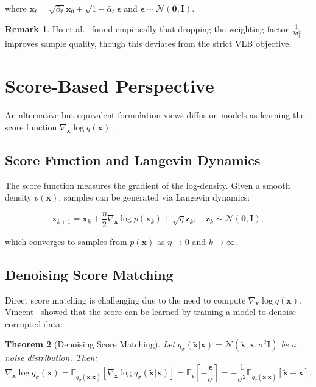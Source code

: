 \documentclass[12pt]{report}
\newtheorem{theorem}{Theorem}[section]
\theoremstyle{definition}
\newtheorem{remark}[theorem]{Remark}
\newcommand{\E}{\mathbb{E}}
\newcommand{\N}{\mathcal{N}}
\begin{document}
where $\mathbf{x}_t = \sqrt{\bar{\alpha}_t}\mathbf{x}_0 + \sqrt{1-\bar{\alpha}_t}\boldsymbol{\epsilon}$ and $\boldsymbol{\epsilon} \sim \N(\mathbf{0}, \mathbf{I})$.

\begin{remark}
Ho et al.~\citep{ho2020denoising} found empirically that dropping the weighting factor $\frac{1}{2\sigma_t^2}$ improves sample quality, though this deviates from the strict VLB objective.
\end{remark}

\section{Score-Based Perspective}

An alternative but equivalent formulation views diffusion models as learning the score function $\nabla_{\mathbf{x}} \log q(\mathbf{x})$~\citep{song2019generative, song2020score}.

\subsection{Score Function and Langevin Dynamics}

The score function measures the gradient of the log-density. Given a smooth density $p(\mathbf{x})$, samples can be generated via Langevin dynamics:

\begin{equation}
\mathbf{x}_{k+1} = \mathbf{x}_k + \frac{\eta}{2}\nabla_{\mathbf{x}} \log p(\mathbf{x}_k) + \sqrt{\eta}\mathbf{z}_k, \quad \mathbf{z}_k \sim \N(\mathbf{0}, \mathbf{I}),
\label{eq:langevin}
\end{equation}

which converges to samples from $p(\mathbf{x})$ as $\eta \to 0$ and $k \to \infty$.

\subsection{Denoising Score Matching}

Direct score matching is challenging due to the need to compute $\nabla_{\mathbf{x}} \log q(\mathbf{x})$. Vincent~\citep{vincent2011connection} showed that the score can be learned by training a model to denoise corrupted data:

\begin{theorem}[Denoising Score Matching]
Let $q_\sigma(\tilde{\mathbf{x}}|\mathbf{x}) = \N(\tilde{\mathbf{x}}; \mathbf{x}, \sigma^2\mathbf{I})$ be a noise distribution. Then:
\begin{equation}
\nabla_{\mathbf{x}} \log q_\sigma(\mathbf{x}) = \E_{q_\sigma(\tilde{\mathbf{x}}|\mathbf{x})}\left[\nabla_{\mathbf{x}} \log q_\sigma(\tilde{\mathbf{x}}|\mathbf{x})\right] = \E_{\boldsymbol{\epsilon}}\left[-\frac{\boldsymbol{\epsilon}}{\sigma}\right] = -\frac{1}{\sigma^2}\E_{q_\sigma(\tilde{\mathbf{x}}|\mathbf{x})}[\tilde{\mathbf{x}} - \mathbf{x}].
\label{eq:score_denoising}
\end{equation}
\end{theorem}
\end{document}
